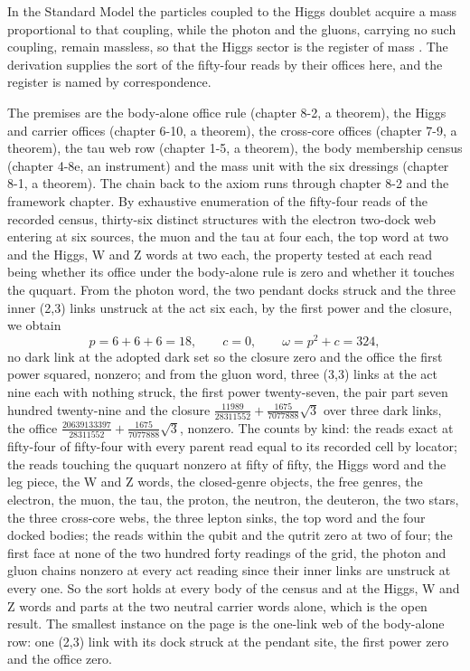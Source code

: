 \begin{chbridge}
In the Standard Model the particles coupled to the Higgs doublet acquire a mass proportional to that coupling, while the photon and the gluons, carrying no such coupling, remain massless, so that the Higgs sector is the register of mass \cite{Weinberg1967,Higgs1964}. The derivation supplies the sort of the fifty-four reads by their offices here, and the register is named by correspondence.
\end{chbridge}
\begin{chproof}
The premises are the body-alone office rule (chapter 8-2, a theorem), the Higgs and carrier offices (chapter 6-10, a theorem), the cross-core offices (chapter 7-9, a theorem), the tau web row (chapter 1-5, a theorem), the body membership census (chapter 4-8e, an instrument) and the mass unit with the six dressings (chapter 8-1, a theorem). The chain back to the axiom runs through chapter 8-2 and the framework chapter. By exhaustive enumeration of the fifty-four reads of the recorded census, thirty-six distinct structures with the electron two-dock web entering at six sources, the muon and the tau at four each, the top word at two and the Higgs, W and Z words at two each, the property tested at each read being whether its office under the body-alone rule is zero and whether it touches the ququart. From the photon word, the two pendant docks struck and the three inner (2,3) links unstruck at the act six each, by the first power and the closure, we obtain
\begin{equation}
p = 6 + 6 + 6 = 18 , \qquad c = 0 , \qquad \omega = p^{2} + c = 324 ,
\end{equation}
no dark link at the adopted dark set so the closure zero and the office the first power squared, nonzero; and from the gluon word, three (3,3) links at the act nine each with nothing struck, the first power twenty-seven, the pair part seven hundred twenty-nine and the closure $\tfrac{11989}{28311552} + \tfrac{1675}{7077888}\sqrt{3}$ over three dark links, the office $\tfrac{20639133397}{28311552} + \tfrac{1675}{7077888}\sqrt{3}$, nonzero. The counts by kind: the reads exact at fifty-four of fifty-four with every parent read equal to its recorded cell by locator; the reads touching the ququart nonzero at fifty of fifty, the Higgs word and the leg piece, the W and Z words, the closed-genre objects, the free genres, the electron, the muon, the tau, the proton, the neutron, the deuteron, the two stars, the three cross-core webs, the three lepton sinks, the top word and the four docked bodies; the reads within the qubit and the qutrit zero at two of four; the first face at none of the two hundred forty readings of the grid, the photon and gluon chains nonzero at every act reading since their inner links are unstruck at every one. So the sort holds at every body of the census and at the Higgs, W and Z words and parts at the two neutral carrier words alone, which is the open result. The smallest instance on the page is the one-link web of the body-alone row: one (2,3) link with its dock struck at the pendant site, the first power zero and the office zero.


\end{chproof}
